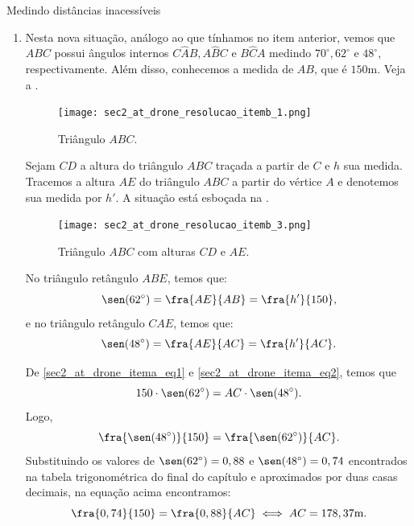 \begin{answer}{Medindo distâncias inacessíveis}
{\begin{enumerate}
Note que o triângulo $ADC$ é retângulo em $D$ e seu ângulo interno $C\hat{A}D$ mede $45^\circ$. Logo, como a soma dos ângulos internos de um triângulo qualquer é $180^\circ$, a medida de $A\hat{C}D$ é também $45^\circ$. Ou seja, $ADC$ é isósceles de base $AC$. Sendo assim, a medida dos lados $AD$ e $CD$ são iguais. Portanto, $h=75$m.

Assim, o drone está a uma altura de $75$m e abaixo do limite estipulado para gerar boas imagens.

\item{}
Nesta nova situação, análogo ao que tínhamos no item anterior, vemos que $ABC$ possui ângulos internos $C\hat{A}B, A\hat{B}C$ e $B\hat{C}A$ medindo $70^\circ, 62^\circ$ e $48^\circ$, respectivamente. Além disso, conhecemos a medida de $AB$, que é $150$m. Veja a .
\begin{figure}[H]
    \centering
    \texttt{[image: sec2\_at\_drone\_resolucao\_itemb\_1.png]}
    \caption{Triângulo $ABC$.}
    \label{sec2_at_drone_resolucao_itemb_1_fig}
\end{figure}

Sejam $CD$ a altura do triângulo $ABC$ traçada a partir de $C$ e $h$ sua medida. Tracemos a altura $AE$ do triângulo $ABC$ a partir do vértice $A$ e denotemos sua medida por $h'$. A situação está esboçada na .
\begin{figure}[H]
    \centering
    \texttt{[image: sec2\_at\_drone\_resolucao\_itemb\_3.png]}
    \caption{Triângulo $ABC$ com alturas $CD$ e $AE$.}
    \label{sec2_at_drone_resolucao_itemb_2_fig}
\end{figure}

No triângulo retângulo $ABE$, temos que:
\begin{equation}
    \sen(62^\circ)=\fra{AE}{AB}=\fra{h'}{150},\label{sec2_at_drone_itema_eq1}
\end{equation}
e no triângulo retângulo $CAE$, temos que:
\begin{equation}
    \sen(48^\circ)=\fra{AE}{AC}=\fra{h'}{AC}.\label{sec2_at_drone_itema_eq2}
\end{equation}

De \eqref{sec2_at_drone_itema_eq1} e \eqref{sec2_at_drone_itema_eq2}, temos que
$$150\cdot\sen(62^\circ)=AC\cdot\sen(48^\circ).$$
Logo, 
\begin{equation}
    \fra{\sen(48^\circ)}{150}=\fra{\sen(62^\circ)}{AC}.\label{sec2_at_drone_itema_eq3}
\end{equation}
Substituindo os valores de $\sen(62^\circ)=0,88$ e $\sen(48^\circ)=0,74$ encontrados na tabela trigonométrica do final do capítulo e aproximados por duas casas decimais, na equação acima encontramos:
$$\fra{0,74}{150}=\fra{0,88}{AC} \iff AC=178,37\text{m}.$$


\end{enumerate}}
\end{answer}
